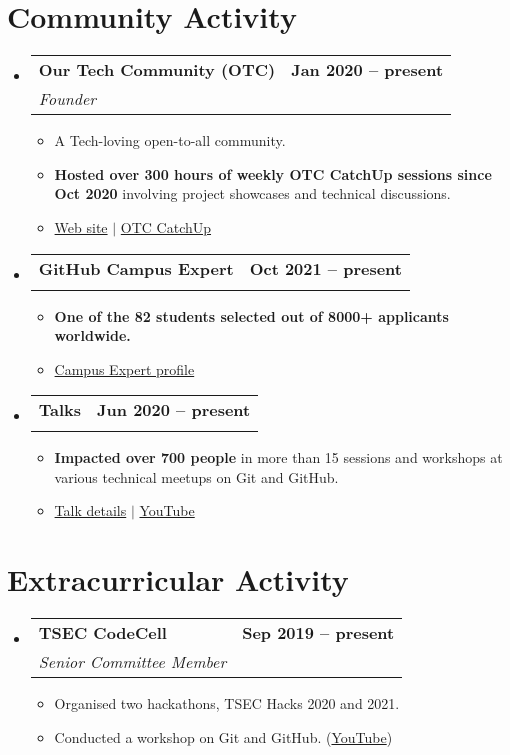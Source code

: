 \documentclass[letterpaper,11pt]{article}
\makeatletter
\newcommand{\resumeItem}[1]{
  \item\small{
    {#1 \vspace{-2pt}}
  }
}
\newcommand{\resumeSubheading}[4]{
  \vspace{-2pt}\item
    \begin{tabular*}{1.0\textwidth}[t]{l@{\extracolsep{\fill}}r}
      \vspace{-2pt}\textbf{#1} & \textbf{\small #2} \\
      \textit{\small#3} & \textit{\small #4} \\
    \end{tabular*}\vspace{-7pt}
}
\newcommand{\resumeSubHeadingListStart}{\begin{itemize}[leftmargin=0.0in, label={}]}
\newcommand{\resumeSubHeadingListEnd}{\end{itemize}}
\newcommand{\resumeItemListStart}{\begin{itemize}}
\newcommand{\resumeItemListEnd}{\end{itemize}\vspace{-5pt}}
\makeatother
\begin{document}
\section{Community Activity}
    \resumeSubHeadingListStart
        \resumeSubheading
            {Our Tech Community (OTC)}{Jan 2020 -- present}
            {Founder}{}
            \vspace{-7pt}
            \resumeItemListStart
                \resumeItem{A Tech-loving open-to-all community.}
                \resumeItem{\textbf{Hosted over 300 hours of weekly OTC CatchUp sessions since Oct 2020} involving project showcases and technical discussions.}
                \resumeItem{\href{https://ourtech.community}{Web site} $|$ \href{https://catchup.ourtech.community}{OTC CatchUp}}
            \resumeItemListEnd
        \vspace{-2pt}

        \resumeSubheading
            {GitHub Campus Expert}{Oct 2021 -- present}
            {}{}
            \vspace{-18pt}
            \resumeItemListStart
                \resumeItem{\textbf{One of the 82 students selected out of 8000+ applicants worldwide.}}
                \resumeItem{\href{https://githubcampus.expert/HarshKapadia2}{Campus Expert profile}}
            \resumeItemListEnd
        \vspace{-4pt}

        \resumeSubheading
            {Talks}{Jun 2020 -- present}
            {}{}
            \vspace{-18pt}
            \resumeItemListStart
                \resumeItem{\textbf{Impacted over 700 people} in more than 15 sessions and workshops at various technical meetups on Git and GitHub.}
                \resumeItem{\href{https://talks.harshkapadia.me}{Talk details} $|$ \href{https://www.youtube.com/HarshKapadia}{YouTube}}
            \resumeItemListEnd
    \resumeSubHeadingListEnd
\vspace{-19pt}


\section{Extracurricular Activity}
    \resumeSubHeadingListStart
        \resumeSubheading
            {TSEC CodeCell}{Sep 2019 -- present}
            {Senior Committee Member}{}
            \resumeItemListStart
                \resumeItem{Organised two hackathons, TSEC Hacks 2020 and 2021.}
                \resumeItem{Conducted a workshop on Git and GitHub. (\href{https://www.youtube.com/watch?v=ArOKEf8nkfw}{YouTube})}
            \resumeItemListEnd
    \resumeSubHeadingListEnd
\vspace{-8pt}
\end{document}
